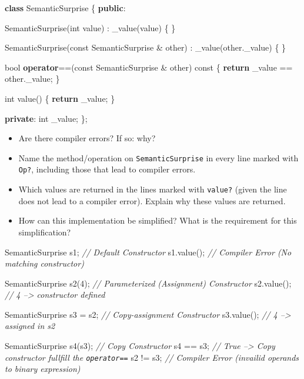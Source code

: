 \documentclass[]{article}
\newenvironment{Shaded}{}{}
\newcommand{\KeywordTok}[1]{\textcolor[rgb]{0.00,0.44,0.13}{\textbf{{#1}}}}
\newcommand{\DataTypeTok}[1]{\textcolor[rgb]{0.56,0.13,0.00}{{#1}}}
\newcommand{\DecValTok}[1]{\textcolor[rgb]{0.25,0.63,0.44}{{#1}}}
\newcommand{\CommentTok}[1]{\textcolor[rgb]{0.38,0.63,0.69}{\textit{{#1}}}}
\newcommand{\NormalTok}[1]{{#1}}
\providecommand{\tightlist}{%
  \setlength{\itemsep}{0pt}\setlength{\parskip}{0pt}}
\begin{document}
\begin{Shaded}
\begin{Highlighting}[]
\KeywordTok{class} \NormalTok{SemanticSurprise \{}
\KeywordTok{public}\NormalTok{:}

  \NormalTok{SemanticSurprise(}\DataTypeTok{int} \NormalTok{value)}
  \NormalTok{: _value(value) \{ \}}

  \NormalTok{SemanticSurprise(}\DataTypeTok{const} \NormalTok{SemanticSurprise & other)}
  \NormalTok{: _value(other._value) \{ \}}

  \DataTypeTok{bool} \KeywordTok{operator}\NormalTok{==(}\DataTypeTok{const} \NormalTok{SemanticSurprise & other) }\DataTypeTok{const} \NormalTok{\{}
    \KeywordTok{return} \NormalTok{_value == other._value;}
  \NormalTok{\}}

  \DataTypeTok{int} \NormalTok{value() \{}
    \KeywordTok{return} \NormalTok{_value;}
  \NormalTok{\}}

\KeywordTok{private}\NormalTok{:}
  \DataTypeTok{int} \NormalTok{_value;}
\NormalTok{\};}
\end{Highlighting}
\end{Shaded}

\begin{itemize}
\tightlist
\item
  Are there compiler errors? If so: why?
\item
  Name the method/operation on \texttt{SemanticSurprise} in every line
  marked with \texttt{Op?}, including those that lead to compiler
  errors.
\item
  Which values are returned in the lines marked with \texttt{value?}
  (given the line does not lead to a compiler error). Explain why these
  values are returned.
\item
  How can this implementation be simplified? What is the requirement for
  this simplification?

\end{itemize}
\begin{Shaded}
\begin{Highlighting}[]
\NormalTok{SemanticSurprise s1;          }\CommentTok{// Default Constructor}
\NormalTok{s1.value();                   }\CommentTok{// Compiler Error (No matching constructor)}

\NormalTok{SemanticSurprise s2(}\DecValTok{4}\NormalTok{);       }\CommentTok{// Parameterized (Assignment) Constructor}
\NormalTok{s2.value();                   }\CommentTok{// 4 --> constructor defined}

\NormalTok{SemanticSurprise s3 = s2;     }\CommentTok{// Copy-assignment Constructor}
\NormalTok{s3.value();                   }\CommentTok{// 4 --> assigned in s2}

\NormalTok{SemanticSurprise s4(s3);      }\CommentTok{// Copy Constructor}
\NormalTok{s4 == s3;                     }\CommentTok{// True --> Copy constructor fullfill the \texttt{operator==}}
\NormalTok{s2 != s3;                     }\CommentTok{// Compiler Error (invailid operands to binary expression)}
\end{Highlighting}
\end{Shaded}
\end{document}
